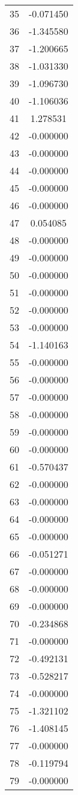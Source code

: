 \documentclass[12pt]{article}
\begin{document}
\begin{longtable}{@{}cc@{}}
35 & -0.071450 \\
36 & -1.345580 \\
37 & -1.200665 \\
38 & -1.031330 \\
39 & -1.096730 \\
40 & -1.106036 \\
41 & 1.278531 \\
42 & -0.000000 \\
43 & -0.000000 \\
44 & -0.000000 \\
45 & -0.000000 \\
46 & -0.000000 \\
47 & 0.054085 \\
48 & -0.000000 \\
49 & -0.000000 \\
50 & -0.000000 \\
51 & -0.000000 \\
52 & -0.000000 \\
53 & -0.000000 \\
54 & -1.140163 \\
55 & -0.000000 \\
56 & -0.000000 \\
57 & -0.000000 \\
58 & -0.000000 \\
59 & -0.000000 \\
60 & -0.000000 \\
61 & -0.570437 \\
62 & -0.000000 \\
63 & -0.000000 \\
64 & -0.000000 \\
65 & -0.000000 \\
66 & -0.051271 \\
67 & -0.000000 \\
68 & -0.000000 \\
69 & -0.000000 \\
70 & -0.234868 \\
71 & -0.000000 \\
72 & -0.492131 \\
73 & -0.528217 \\
74 & -0.000000 \\
75 & -1.321102 \\
76 & -1.408145 \\
77 & -0.000000 \\
78 & -0.119794 \\
79 & -0.000000 \\

\end{longtable}
\end{document}
